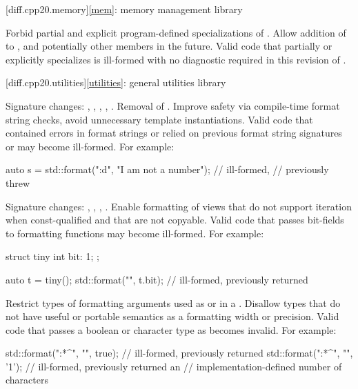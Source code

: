 [diff.cpp20.memory]{\ref{mem}: memory management library}

\change
Forbid partial and explicit program-defined specializations
of .
\rationale
Allow addition of  to ,
and potentially other members in the future.
\effect
Valid \CppXX{} code
that partially or explicitly specializes 
is ill-formed with no diagnostic required in this revision of \Cpp{}.

[diff.cpp20.utilities]{\ref{utilities}: general utilities library}

\change
Signature changes: , , ,
, .
Removal of .
\rationale
Improve safety via compile-time format string checks,
avoid unnecessary template instantiations.
\effect
Valid \CppXX{} code that
contained errors in format strings or
relied on previous format string signatures or
 may become ill-formed.
For example:
\begin{codeblock}
auto s = std::format("{:d}", "I am not a number");      // ill-formed,
                                                        // previously threw 
\end{codeblock}

\change
Signature changes: , , ,
.
\rationale
Enable formatting of views
that do not support iteration when const-qualified and
that are not copyable.
\effect
Valid \CppXX{} code that passes bit-fields to formatting functions
may become ill-formed.
For example:
\begin{codeblock}
struct tiny {
  int bit: 1;
};

auto t = tiny();
std::format("{}", t.bit);       // ill-formed, previously returned 
\end{codeblock}

\change
Restrict types of formatting arguments
used as  or  in
a .
\rationale
Disallow types that do not have useful or portable semantics as
a formatting width or precision.
\effect
Valid \CppXX{} code that passes a boolean or character type as
 becomes invalid.
For example:
\begin{codeblock}
std::format("{:*^{}}", "", true);   // ill-formed, previously returned 
std::format("{:*^{}}", "", '1');    // ill-formed, previously returned an
                                    // implementation-defined number of  characters
\end{codeblock}

